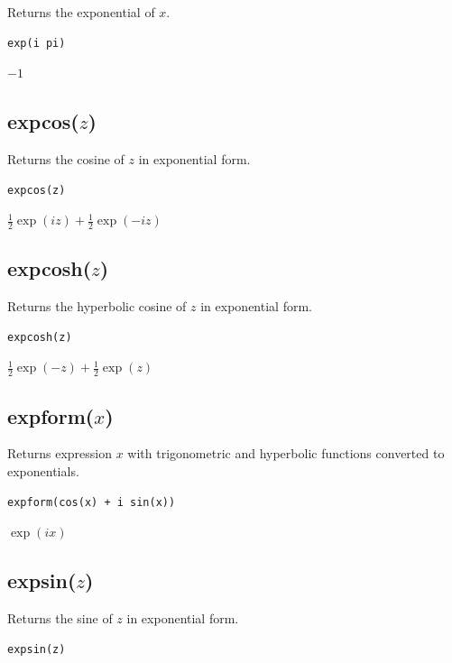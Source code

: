 \documentclass[12pt]{article}
\begin{document}
Returns the exponential of $x$.

{\color{blue}
\begin{verbatim}
exp(i pi)
\end{verbatim}
}

$-1$

\subsection*{expcos($z$)}

Returns the cosine of $z$ in exponential form.

{\color{blue}
\begin{verbatim}
expcos(z)
\end{verbatim}
}

$\displaystyle \tfrac{1}{2}\exp(iz)+\tfrac{1}{2}\exp(-iz)$

\subsection*{expcosh($z$)}

Returns the hyperbolic cosine of $z$ in exponential form.

{\color{blue}
\begin{verbatim}
expcosh(z)
\end{verbatim}
}

$\displaystyle \tfrac{1}{2}\exp(-z)+\tfrac{1}{2}\exp(z)$

\subsection*{expform($x$)}

Returns expression $x$ with trigonometric and hyperbolic functions
converted to exponentials.

{\color{blue}
\begin{verbatim}
expform(cos(x) + i sin(x))
\end{verbatim}
}

$\exp(ix)$

\subsection*{expsin($z$)}

Returns the sine of $z$ in exponential form.

{\color{blue}
\begin{verbatim}
expsin(z)
\end{verbatim}
}
\end{document}
